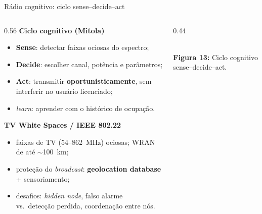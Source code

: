 \documentclass[aspectratio=169,11pt]{beamer}
\begin{document}
\begin{frame}{Rádio cognitivo: ciclo sense--decide--act}
  \small
  \begin{columns}
    \begin{column}{0.56\textwidth}
      \textbf{Ciclo cognitivo (Mitola)}
      \begin{itemize}
        \item \textbf{Sense}: detectar faixas ociosas do espectro;
        \item \textbf{Decide}: escolher canal, potência e parâmetros;
        \item \textbf{Act}: transmitir \textbf{oportunisticamente}, sem interferir no usuário licenciado;
        \item \emph{learn}: aprender com o histórico de ocupação.
      \end{itemize}
      \textbf{TV White Spaces / IEEE 802.22}
      \begin{itemize}
        \item faixas de TV (54--862~MHz) ociosas; WRAN de até $\sim$100~km;
        \item proteção do \emph{broadcast}: \textbf{geolocation database} + sensoriamento;
        \item desafios: \emph{hidden node}, falso alarme vs.\ detecção perdida, coordenação entre nós.
      \end{itemize}
    \end{column}
    \begin{column}{0.44\textwidth}
      \begin{center}
        \\[1mm]
        {\scriptsize \textbf{Figura 13:} Ciclo cognitivo sense--decide--act.}
      \end{center}
    \end{column}
  \end{columns}
\end{frame}
\end{document}
